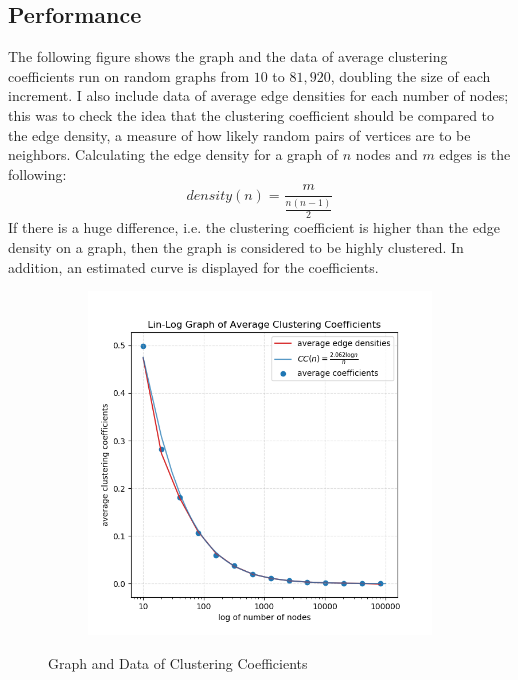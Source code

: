 \documentclass{article}
\begin{document}
\subsection{Performance}
    The following figure shows the graph and the data of average clustering
    coefficients run on random graphs from $10$ to $81, 920$, doubling the size
    of each increment. I also include data of average edge densities for each
    number of nodes; this was to check the idea that the clustering coefficient
    should be compared to the edge density, a measure of how likely random pairs
    of vertices are to be neighbors. Calculating the edge density for a graph of 
    $n$ nodes and $m$ edges is the following:
    \begin{equation*}
        density(n) = \frac{m}{\frac{n(n-1)}{2}}
    \end{equation*}
    \noindent If there is a huge difference, i.e. the clustering coefficient is
    higher than the edge density on a graph, then the graph is considered to be
    highly clustered. In addition, an estimated curve is displayed for the
    coefficients.
    \begin{figure}[H]
        \centering
        \begin{subfigure}{0.6\textwidth}
            \includegraphics[width=\linewidth]{"../images/cluster"}
        \end{subfigure}
        \caption{Graph and Data of Clustering Coefficients}
    \end{figure}
\end{document}
